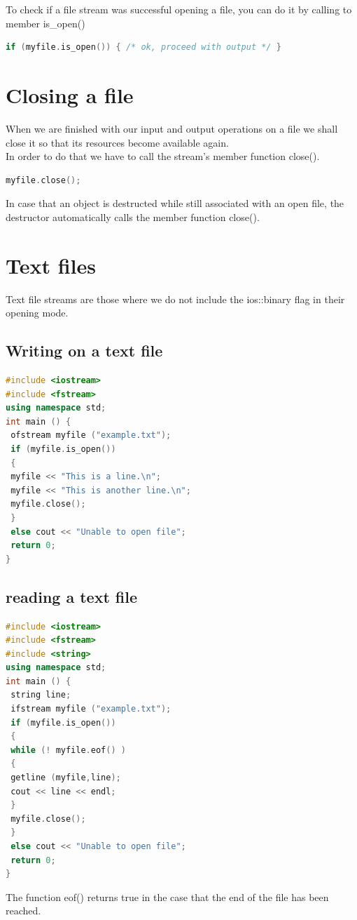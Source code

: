 \documentclass[12pt,oneside]{book}
\begin{document}
To check if a file stream was successful opening a file, you can do it by calling to member is\_open()
\begin{lstlisting}[language=C++]
    if (myfile.is_open()) { /* ok, proceed with output */ }
\end{lstlisting}
\section{Closing a file}
When we are finished with our input and output operations on a file we shall close it so that its resources become available again.\\
In order to do that we have to call the stream's member function close().
	\begin{lstlisting}[language=C++]
    myfile.close();
\end{lstlisting}
In case that an object is destructed while still associated with an open file, the destructor automatically calls the member function close().
\section{Text files}
Text file streams are those where we do not include the ios::binary flag in their opening mode.
\subsection{Writing on a text file}
\begin{lstlisting}[language=C++]
#include <iostream>
#include <fstream>
using namespace std; 
int main () { 
 ofstream myfile ("example.txt"); 
 if (myfile.is_open()) 
 { 
 myfile << "This is a line.\n"; 
 myfile << "This is another line.\n"; 
 myfile.close(); 
 } 
 else cout << "Unable to open file"; 
 return 0; 
} 
\end{lstlisting}
\subsection{ reading a text file}
\begin{lstlisting}[language=C++]
#include <iostream>
#include <fstream>
#include <string>
using namespace std; 
int main () { 
 string line; 
 ifstream myfile ("example.txt"); 
 if (myfile.is_open()) 
 { 
 while (! myfile.eof() ) 
 { 
 getline (myfile,line); 
 cout << line << endl; 
 } 
 myfile.close(); 
 } 
 else cout << "Unable to open file"; 
 return 0; 
}
\end{lstlisting}
The function eof() returns true in the case that the end of the file has been reached.
\end{document}
